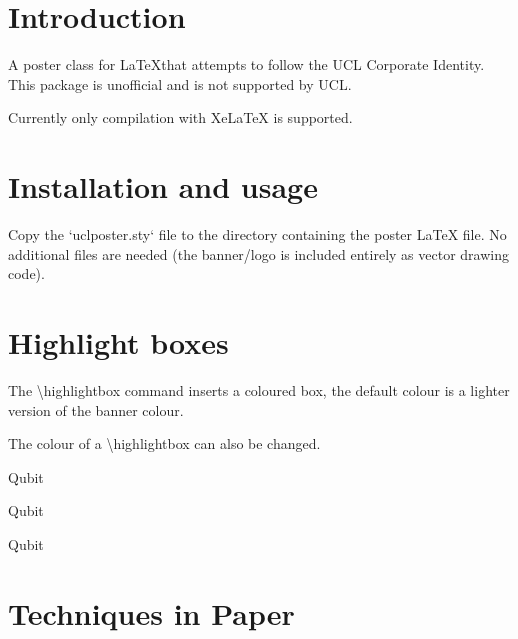 \begin{multicols}{3}

\section*{Introduction}
A poster class for \LaTeX that attempts to follow the UCL Corporate Identity.
This package is unofficial and is not supported by UCL.

Currently only compilation with XeLaTeX is supported.

\section*{Installation and usage}

Copy the `uclposter.sty` file to the directory containing the poster LaTeX file.
No additional files are needed (the banner/logo is included entirely as vector drawing code).

\section*{Highlight boxes}

\begin{highlightbox}
	The \textbackslash highlightbox command inserts a coloured box, the default colour is a lighter version of the banner colour.
\end{highlightbox}

\begin{highlightbox}
	The colour of a \textbackslash highlightbox can also be changed.
\end{highlightbox}

\begin{highlightbox}
	Qubit
\end{highlightbox}

\begin{highlightbox}
	Qubit
\end{highlightbox}

\begin{highlightbox}
	Qubit
\end{highlightbox}

\columnbreak

\section*{Techniques in Paper}




\end{multicols}
